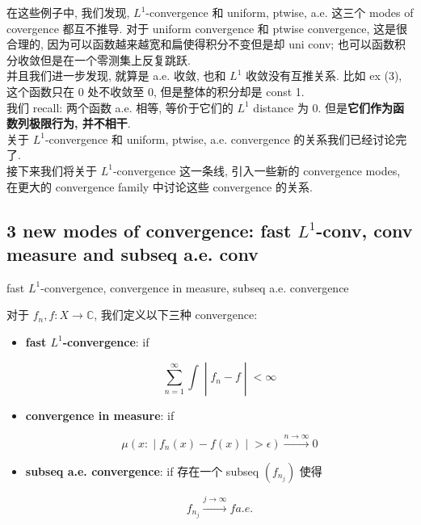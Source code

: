 \documentclass{qlnotes-export}
\begin{document}
在这些例子中, 我们发现, \(L^{1}\)-convergence 和 uniform, ptwise, a.e. 这三个 modes of covergence 都互不推导. 对于 uniform convergence 和 ptwise convergence, 这是很合理的, 因为可以函数越来越宽和扁使得积分不变但是却 uni conv; 也可以函数积分收敛但是在一个零测集上反复跳跃.\\
并且我们进一步发现, 就算是 a.e. 收敛, 也和 \(L^{1}\) 收敛没有互推关系. 比如 ex (3), 这个函数只在 \(0\) 处不收敛至 0, 但是整体的积分却是 const 1.\\
我们 recall: 两个函数 a.e. 相等, 等价于它们的 \(L^{1}\) distance 为 0. 但是\textbf{它们作为函数列极限行为, 并不相干}.\\
关于 \(L^{1}\)-convergence 和 uniform, ptwise, a.e. convergence 的关系我们已经讨论完了.\\
接下来我们将关于 \(L^{1}\)-convergence 这一条线, 引入一些新的 convergence modes, 在更大的 convergence family 中讨论这些 convergence 的关系.

\subsection{\texorpdfstring{3 new modes of convergence: fast \(L^{1}\)-conv, conv measure and subseq a.e. conv}{3 new modes of convergence: fast L\^{}\{1\}-conv, conv measure and subseq a.e. conv}}\label{new-modes-of-convergence-fast-l1-conv-conv-measure-and-subseq-a.e.-conv}

\begin{definition}{fast \(L^{1}\)-convergence, convergence in measure, subseq a.e.
convergence}\label{def-05-integration-of-real-and-complex-functions-fast-l-1-convergence-convergence-in-measure-subseq-a-e-convergen}

对于 \(f_{n},f:X\rightarrow{\mathbb{C}}\), 我们定义以下三种 convergence:

\begin{itemize}
\item
  \textbf{fast \(L^{1}\)-convergence}: if

  \[\left. \sum\limits_{n = 1}^{\infty}\int \middle| f_{n} - f \middle| < \infty \right.\]
\item
  \textbf{convergence in measure}: if

  \[\left. \mu(x: \middle| f_{n}(x) - f(x) \middle| > \epsilon)\overset{n\rightarrow\infty}{\rightarrow}0 \right.\]
\item
  \textbf{subseq a.e. convergence}: if 存在一个 subseq \((f_{n_{j}})\) 使得

  \[f_{n_{j}}\overset{j\rightarrow\infty}{\rightarrow}f a.e.\]
\end{itemize}

\end{definition}
\end{document}
